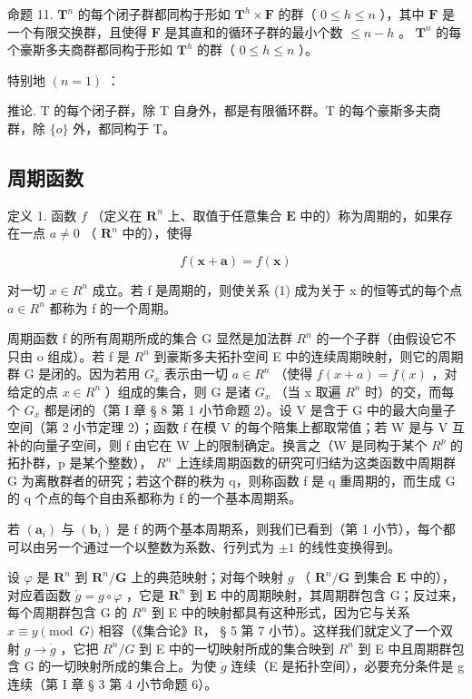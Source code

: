 命题 11. \(\mathbf{T}^n\) 的每个闭子群都同构于形如 \(\mathbf{T}^h \times \mathbf{F}\) 的群（ \(0 \leqslant h \leqslant n\) ），其中 \(\mathbf{F}\) 是一个有限交换群，且使得 \(\mathbf{F}\) 是其直和的循环子群的最小个数 \(\leqslant n - h\) 。 \(\mathbf{T}^n\) 的每个豪斯多夫商群都同构于形如 \(\mathbf{T}^h\) 的群（ \(0 \leqslant h \leqslant n\) ）。

特别地 \((n = 1)\) ：

推论. T 的每个闭子群，除 T 自身外，都是有限循环群。T 的每个豪斯多夫商群，除 \(\{o\}\) 外，都同构于 T。

\subsection{周期函数}

定义 1. 函数 \(f\) （定义在 \(\mathbf{R}^n\) 上、取值于任意集合 \(\mathbf{E}\) 中的）称为周期的，如果存在一点 \(a \neq 0\) （ \(\mathbf{R}^n\) 中的），使得

\[
f (\boldsymbol {x} + \boldsymbol {a}) = f (\boldsymbol {x})\tag{1}
\]

对一切 \(x \in R^{n}\) 成立。若 f 是周期的，则使关系 (1) 成为关于 x 的恒等式的每个点 \(a \in R^{n}\) 都称为 f 的一个周期。

周期函数 f 的所有周期所成的集合 G 显然是加法群 \(R^{n}\) 的一个子群（由假设它不只由 o 组成）。若 f 是 \(R^{n}\) 到豪斯多夫拓扑空间 E 中的连续周期映射，则它的周期群 G 是闭的。因为若用 \(G_{x}\) 表示由一切 \(a \in R^{n}\) （使得 \(f(x + a) = f(x)\) ，对给定的点 \(x \in R^{n}\) ）组成的集合，则 G 是诸 \(G_{x}\) （当 x 取遍 \(R^{n}\) 时）的交，而每个 \(G_{x}\) 都是闭的（第 I 章 § 8 第 1 小节命题 2）。设 V 是含于 G 中的最大向量子空间（第 2 小节定理 2）；函数 f 在模 V 的每个陪集上都取常值；若 W 是与 V 互补的向量子空间，则 f 由它在 W 上的限制确定。换言之（W 是同构于某个 \(R^{p}\) 的拓扑群，p 是某个整数）， \(R^{n}\) 上连续周期函数的研究可归结为这类函数中周期群 G 为离散群者的研究；若这个群的秩为 q，则称函数 f 是 q 重周期的，而生成 G 的 q 个点的每个自由系都称为 f 的一个基本周期系。

若 \((\boldsymbol{a}_{i})\) 与 \((\boldsymbol{b}_{i})\) 是 f 的两个基本周期系，则我们已看到（第 1 小节），每个都可以由另一个通过一个以整数为系数、行列式为 \(\pm1\) 的线性变换得到。

设 \(\varphi\) 是 \(\mathbf{R}^n\) 到 \(\mathbf{R}^n/\mathbf{G}\) 上的典范映射；对每个映射 \(g\) （ \(\mathbf{R}^n/\mathbf{G}\) 到集合 \(\mathbf{E}\) 中的），对应着函数 \(\dot{g}=g\circ\varphi\) ，它是 \(\mathbf{R}^n\) 到 \(\mathbf{E}\) 中的周期映射，其周期群包含 G；反过来，每个周期群包含 G 的 \(R^{n}\) 到 E 中的映射都具有这种形式，因为它与关系 \(x \equiv y \pmod{G}\) 相容（《集合论》R， § 5 第 7 小节）。这样我们就定义了一个双射 \(g \to \dot{g}\) ，它把 \(R^{n}/G\) 到 E 中的一切映射所成的集合映到 \(R^{n}\) 到 E 中且周期群包含 G 的一切映射所成的集合上。为使 \(\dot{g}\) 连续（E 是拓扑空间），必要充分条件是 g 连续（第 I 章 § 3 第 4 小节命题 6）。

